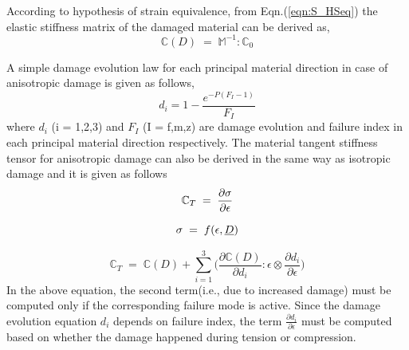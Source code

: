 \documentclass[a4paper,12pt]{extarticle}
\begin{document}
 According to hypothesis of strain equivalence, from Eqn.(\ref{eqn:S_HSeq}) the elastic stiffness matrix of the damaged material can be derived as,\\
 \begin{equation}
\mathbb{C}(D) \; = \; \mathbb{M}^{-1} : \mathbb{C}_{0}   
\label{Damaged_elasticity_matrix_2}
\end{equation}


A simple damage evolution law for each principal material direction in case of anisotropic damage is given as follows,
\begin{equation}
d_{i} = 1 - \frac{e^{-P(F_{I} - 1)} }{F_{I}}  
\label{exponential damage equation}
\end{equation}
where $d_{i}$ (i = 1,2,3) and $F_{I}$ (I = f,m,z) are damage evolution and failure index in each principal material direction respectively.
The material tangent stiffness tensor for anisotropic damage can also be derived in the same way as isotropic damage and it is given as follows
\begin{equation*}
\large{ \mathbb{C}_{T}  \; = \;\frac{\partial \sigma}{\partial \epsilon}  }
\end{equation*}

\begin{equation*}
\large{\sigma  \; = \; f(\epsilon, \underline{D}) }
\end{equation*}

\begin{equation}
\mathbb{C}_{T}  \; = \; \mathbb{C}(D) + \sum_{i = 1}^{3} \Big( \frac{\partial \mathbb{C}(D) }{\partial d_{i}} : \epsilon \otimes \frac{\partial d_{i}}{\partial \epsilon }\Big)
\label{Anisotropic tangent stiffness} 
\end{equation}
In the above equation, the second term(i.e., due to increased damage) must be computed only if the corresponding failure mode is active. Since the damage evolution equation $d_{i}$ depends on failure index, the term $\frac{\partial d_{i}}{\partial \epsilon }$ must be computed based on whether the damage happened during tension or compression.
\end{document}
